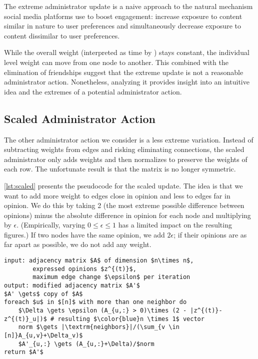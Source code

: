 The extreme administrator update is a naive approach
to the natural mechanism social media platforms use
to boost engagement: increase exposure to content
similar in nature to user preferences
and simultaneously decrease exposure to content
dissimilar to user preferences.

While the overall weight (interpreted as time
by \cite{chitra20analyzing}) stays constant,
the individual level weight can move from one
node to another.
This combined with the elimination of friendships
suggest that the extreme update is not a reasonable
administrator action.
Nonetheless, analyzing it provides insight into an
intuitive idea and the extremes of a potential
administrator action.

\subsection{Scaled Administrator Action}
The other administrator action we consider
is a less extreme variation.
Instead of subtracting weights from edges
and risking eliminating connections,
the scaled administrator only adds weights
and then normalizes to preserve the 
weights of each row.
The unfortunate result is that the
matrix is no longer symmetric.

\cref{lst:scaled} presents the pseudocode for
the scaled update.
The idea is that we want to add more weight
to edges close in opinion and less to edges far
in opinion.
We do this by taking 2 (the most extreme possible
difference between opinions) minus the absolute
difference in opinion for each node
and multiplying by $\epsilon$.
(Empirically, varying $0 \leq \epsilon \leq 1$
has a limited impact on the resulting figures.)
If two nodes have the same opinion, we add
$2\epsilon$; if their opinions are as far
apart as possible, we do not add any weight.

\begin{minipage}{\linewidth}
\begin{lstlisting}[caption={Scaled Administrator Update.}, label={lst:scaled}]
input: adjacency matrix $A$ of dimension $n\times n$,
        expressed opinions $z^{(t)}$,
        maximum edge change $\epsilon$ per iteration
output: modified adjacency matrix $A'$
$A' \gets$ copy of $A$
foreach $u$ in $[n]$ with more than one neighbor do
    $\Delta \gets \epsilon (A_{u,:} > 0)\times (2 - |z^{(t)}-z^{(t)}_u|)$ # resulting $\color{blue}n \times 1$ vector
    norm $\gets |\textrm{neighbors}|/(\sum_{v \in [n]}A_{u,v}+\Delta_v)$
    $A'_{u,:} \gets (A_{u,:}+\Delta)/$norm
return $A'$
\end{lstlisting}
\end{minipage}

